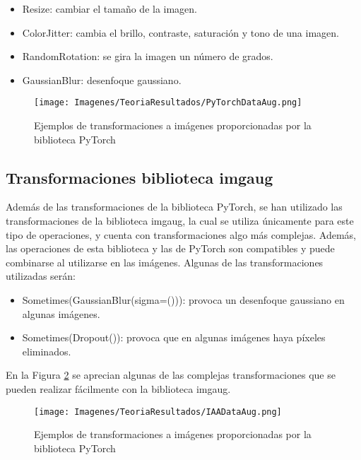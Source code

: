 \documentclass{report}
\begin{document}
\begin{itemize}
    \item Resize: cambiar el tamaño de la imagen.
    \item ColorJitter: cambia el brillo, contraste, saturación y tono de una imagen.
    \item RandomRotation: se gira la imagen un número de grados.
    \item GaussianBlur: desenfoque gaussiano.
\end{itemize}



\begin{figure}[hbpt]
	\centering
	 \texttt{[image: Imagenes/TeoriaResultados/PyTorchDataAug.png]}
	 \caption{ Ejemplos de transformaciones a imágenes proporcionadas por la biblioteca PyTorch }
	 \label{fig:AumentacionDatosEjPytorch}
\end{figure}

\subsection{Transformaciones biblioteca imgaug}

Además de las transformaciones de la biblioteca PyTorch, se han utilizado las transformaciones de la biblioteca imgaug, la cual se utiliza únicamente para este tipo de operaciones, y cuenta con transformaciones algo más complejas. Además, las operaciones de esta biblioteca y las de PyTorch son compatibles y puede combinarse al utilizarse en las imágenes. Algunas de las transformaciones utilizadas serán:

\begin{itemize}
    \item Sometimes(GaussianBlur(sigma=())): provoca un desenfoque gaussiano en algunas imágenes.
    \item Sometimes(Dropout()): provoca que en algunas imágenes haya píxeles eliminados.
\end{itemize}

En la Figura \ref{fig:AumentacionDatosIAA} se aprecian algunas de las complejas transformaciones que se pueden realizar fácilmente con la biblioteca imgaug.


\begin{figure}[hbpt]
	\centering
	 \texttt{[image: Imagenes/TeoriaResultados/IAADataAug.png]}
	 \caption{ Ejemplos de transformaciones a imágenes proporcionadas por la biblioteca PyTorch }
	 \label{fig:AumentacionDatosIAA}
\end{figure}
\end{document}
